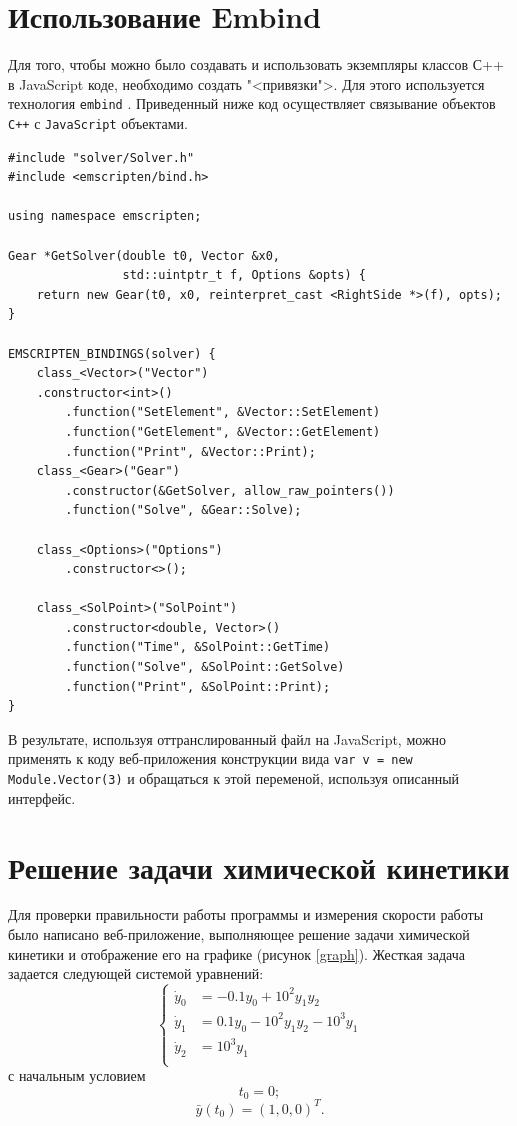 \documentclass[oneside,final,14pt]{extreport}
\begin{document}
\section{Использование Embind}
Для того, чтобы можно было создавать и использовать экземпляры классов С++ в JavaScript коде, необходимо создать "<привязки">. Для этого используется технология \texttt{embind} \cite{emscripten}. Приведенный ниже код осуществляет связывание объектов \texttt{С++} с \texttt{JavaScript} объектами.
\begin{verbatim}
#include "solver/Solver.h"
#include <emscripten/bind.h>

using namespace emscripten;

Gear *GetSolver(double t0, Vector &x0,
                std::uintptr_t f, Options &opts) {
    return new Gear(t0, x0, reinterpret_cast <RightSide *>(f), opts);
}

EMSCRIPTEN_BINDINGS(solver) {
    class_<Vector>("Vector")
    .constructor<int>()
        .function("SetElement", &Vector::SetElement)
        .function("GetElement", &Vector::GetElement)
        .function("Print", &Vector::Print);
    class_<Gear>("Gear")
        .constructor(&GetSolver, allow_raw_pointers())
        .function("Solve", &Gear::Solve);

    class_<Options>("Options")
        .constructor<>();
        		
    class_<SolPoint>("SolPoint")
        .constructor<double, Vector>()
        .function("Time", &SolPoint::GetTime)
        .function("Solve", &SolPoint::GetSolve)
        .function("Print", &SolPoint::Print);
}
\end{verbatim}
В результате, используя оттранслированный файл на JavaScript, можно применять к коду веб-приложения конструкции вида \texttt{var v = new Module.Vector(3)} и обращаться к этой переменой, используя описанный интерфейс.

\section{Решение задачи химической кинетики}

Для проверки правильности работы программы и измерения скорости работы было написано веб-приложение, выполняющее решение задачи химической кинетики и отображение его на графике (рисунок \ref{graph}). Жесткая задача задается следующей системой уравнений:
\[
\left\{
\begin{aligned}
	\dot y_0 &= -0.1y_0+10^2y_1y_2\\ 
	\dot y_1 &= 0.1y_0-10^2y_1y_2-10^3y_1\\
	\dot y_2 &= 10^3y_1\\
\end{aligned}
\right.
\]
с начальным условием 
\[
t_0=0;
\]
\[
\bar y(t_0)=(1,0,0)^T.
\]
\end{document}
